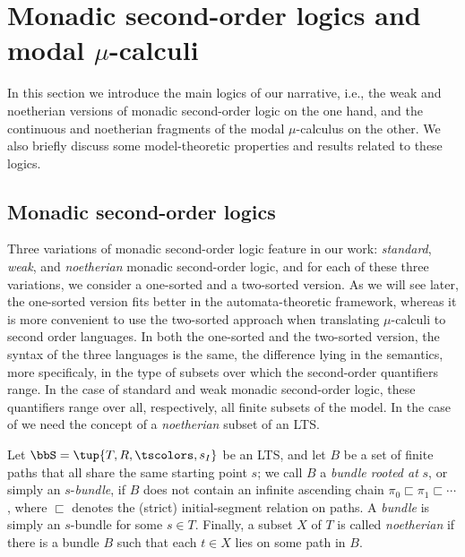 \section{Monadic second-order logics and modal $\mu$-calculi}
\label{s:mso-mu}

In this section we introduce the main logics of our narrative, i.e., the weak 
and noetherian versions of monadic second-order logic on the one hand, and the 
continuous and noetherian fragments of the modal $\mu$-calculus on the other.
We also briefly discuss some model-theoretic properties and results related to 
these logics.

\subsection{Monadic second-order logics}
\label{sec:prel-so}

Three variations of monadic second-order logic feature in our work:
\emph{standard}, \emph{weak}, and \emph{noetherian} monadic second-order 
logic, and for each of these three variations, we consider a one-sorted and 
a two-sorted version.
As we will see later, the one-sorted version fits better in the 
automata-theoretic framework, whereas it is more convenient to use the 
two-sorted approach when translating $\mu$-calculi to second order languages.
In both the one-sorted and the two-sorted version, the syntax of the three 
languages is the same, the difference lying in the semantics, more specificaly,
in the type of subsets over which the second-order quantifiers range.
In the case of standard and weak monadic second-order logic, these quantifiers 
range over all, respectively, all finite subsets of the model.
In the case of \nmso we need the concept of a \emph{noetherian} subset of an LTS.

\begin{definition}
\label{d:bundle1}
Let $\bbS = \tup{T,R,\tscolors, s_I}$ be an LTS, and let $B$ be a set of finite
paths that all share the same starting point $s$; we call $B$ a \emph{bundle 
rooted at} $s$, or simply an $s$-\emph{bundle}, if $B$ does not contain an
infinite ascending chain $\pi_{0} \sqsubset \pi_{1} \sqsubset 
\cdots$, where $\sqsubset$ denotes the (strict) initial-segment relation on 
paths.
A \emph{bundle} is simply an $s$-bundle for some $s \in T$.
Finally, a subset $X$ of $T$ is called \emph{noetherian} if there is a bundle 
$B$ such that each $t \in X$ lies on some path in $B$.
\end{definition}

